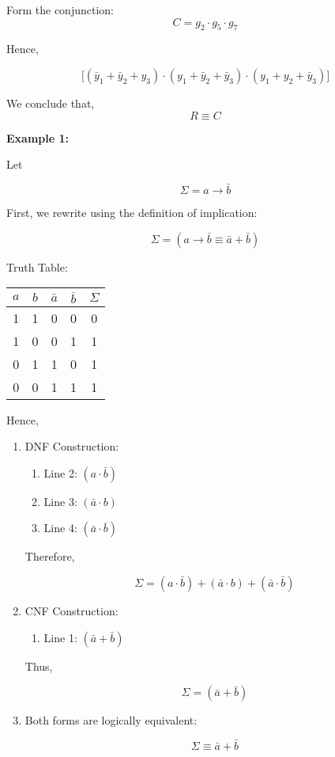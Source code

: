 \documentclass[12pt,a4paper,openany]{article}
\begin{document}
Form the conjunction: 
$$C = g_2 \cdot g_5 \cdot g_7$$

Hence,

$$\big[(\bar y_1 + \bar y_2 + y_3) \cdot (y_1 + \bar y_2 + \bar y_3) \cdot (y_1 + y_2 + \bar y_3)\big]$$

We conclude that, 
$$R \equiv C$$

\newpage

\textbf{Example 1:}

Let

$$\Sigma = a \to \bar b$$

First, we rewrite using the definition of implication:

$$\Sigma = (a \to \bar b \equiv \bar a + \bar b)$$

Truth Table: 

\begin{center}
\begin{tabular}{|c|c|c|c|c|}
\hline
$a$ & $b$ & $\bar a$ & $\bar b$ & $\Sigma$ \\
\hline
1 & 1 & 0 & 0 & 0 \\
\hline
1 & 0 & 0 & 1 & 1 \\
\hline
0 & 1 & 1 & 0 & 1 \\
\hline
0 & 0 & 1 & 1 & 1 \\
\hline
\end{tabular}
\end{center}

Hence,

\begin{enumerate}
\item DNF Construction:

  \begin{enumerate}
  \item Line 2: $(a \cdot \bar b)$
  \item Line 3: $(\bar a \cdot b)$
  \item Line 4: $(\bar a \cdot \bar b)$
  \end{enumerate}

  Therefore,

  $$\Sigma= (a \cdot \bar b) + (\bar a \cdot b) + (\bar a \cdot \bar b)$$
\item CNF Construction:

  \begin{enumerate}
  \item Line 1: $(\bar a + \bar b)$
  \end{enumerate}

  Thus,

  $$\Sigma= (\bar a + \bar b)$$
\item Both forms are logically equivalent:

  $$\Sigma \equiv \bar a + \bar b$$
\end{enumerate}
\end{document}

